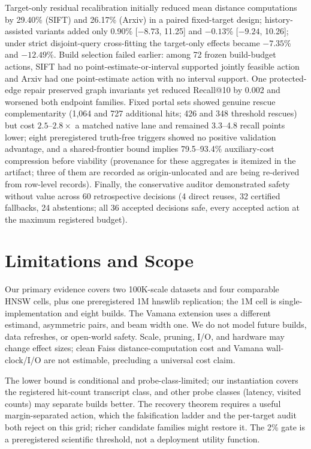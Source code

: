 \documentclass{article}
\begin{document}
Target-only residual recalibration initially reduced mean distance computations by 29.40\% (SIFT) and 26.17\%
(Arxiv) in a paired fixed-target design; history-assisted variants added only 0.90\% [$-8.73$, 11.25] and
$-0.13$\% [$-9.24$, 10.26]; under strict disjoint-query cross-fitting the target-only effects became
$-7.35$\% and $-12.49$\%. Build selection failed earlier: among 72 frozen build-budget actions, SIFT had no
point-estimate-or-interval supported jointly feasible action and Arxiv had one point-estimate action with no
interval support. One protected-edge repair preserved graph invariants yet reduced Recall@10 by 0.002 and
worsened both endpoint families. Fixed portal sets showed genuine rescue complementarity (1{,}064 and 727
additional hits; 426 and 348 threshold rescues) but cost $2.5$--$2.8\times$ a matched native lane and
remained 3.3--4.8 recall points lower; eight preregistered truth-free triggers showed no positive validation
advantage, and a shared-frontier bound implies 79.5--93.4\% auxiliary-cost compression before viability
(provenance for these aggregates is itemized in the artifact; three of them are recorded as
origin-unlocated and are being re-derived from row-level records). Finally, the conservative auditor
demonstrated safety without value across 60 retrospective decisions (4 direct reuses, 32 certified
fallbacks, 24 abstentions; all 36 accepted decisions safe, every accepted action at the maximum registered
budget).

\section{Limitations and Scope}
\label{sec:limitations}

Our primary evidence covers two 100K-scale datasets and four comparable HNSW cells, plus one preregistered
1M hnswlib replication; the 1M cell is single-implementation and eight builds. The Vamana extension uses a
different estimand, asymmetric pairs, and beam width one. We do not model future builds, data refreshes, or
open-world safety. Scale, pruning, I/O, and hardware may change effect sizes; clean Faiss
distance-computation cost and Vamana wall-clock/I/O are not estimable, precluding a universal cost claim.

The lower bound is conditional and probe-class-limited; our instantiation covers the registered hit-count
transcript class, and other probe classes (latency, visited counts) may separate builds better. The recovery
theorem requires a useful margin-separated action, which the falsification ladder and the per-target audit
both reject on this grid; richer candidate families might restore it. The 2\% gate is a preregistered
scientific threshold, not a deployment utility function.
\end{document}
